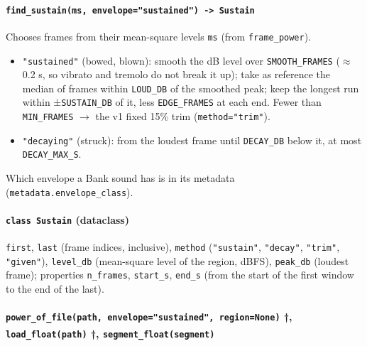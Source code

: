 \documentclass[
  10pt,
]{article}
\providecommand{\tightlist}{%
  \setlength{\itemsep}{0pt}\setlength{\parskip}{0pt}}
\begin{document}
\paragraph{\texorpdfstring{\texttt{find\_sustain(ms,\ envelope="sustained")\ -\textgreater{}\ Sustain}}{find\_sustain(ms, envelope="sustained") -\textgreater{} Sustain}}

Chooses frames from their mean-square levels \texttt{ms}
(from \texttt{frame\_power}).

\begin{itemize}
\tightlist
\item
  \texttt{"sustained"} (bowed, blown): smooth the dB level
  over \texttt{SMOOTH\_FRAMES} ($\approx$ 0.2 s, so vibrato and
  tremolo do not break it up); take as reference the median
  of frames within \texttt{LOUD\_DB} of the smoothed peak;
  keep the longest run within ±\texttt{SUSTAIN\_DB} of it,
  less \texttt{EDGE\_FRAMES} at each end. Fewer than
  \texttt{MIN\_FRAMES} $\rightarrow$ the v1 fixed 15\% trim
  (\texttt{method="trim"}).
\item
  \texttt{"decaying"} (struck): from the loudest frame until
  \texttt{DECAY\_DB} below it, at most
  \texttt{DECAY\_MAX\_S}.
\end{itemize}

Which envelope a Bank sound has is in its metadata
(\texttt{metadata.envelope\_class}).

\paragraph{\texorpdfstring{\texttt{class\ Sustain}
(dataclass)}{class Sustain (dataclass)}}

\texttt{first}, \texttt{last} (frame indices, inclusive),
\texttt{method} (\texttt{"sustain"}, \texttt{"decay"},
\texttt{"trim"}, \texttt{"given"}), \texttt{level\_db}
(mean-square level of the region, dBFS), \texttt{peak\_db}
(loudest frame); properties \texttt{n\_frames},
\texttt{start\_s}, \texttt{end\_s} (from the start of the
first window to the end of the last).

\paragraph{\texorpdfstring{\texttt{power\_of\_file(path,\ envelope="sustained",\ region=None)}
†, \texttt{load\_float(path)} †,
\texttt{segment\_float(segment)}~\textsuperscript{\textdagger}}{power\_of\_file(path, envelope="sustained", region=None) †, load\_float(path) †, segment\_float(segment) (needs pydub)}}
\end{document}
